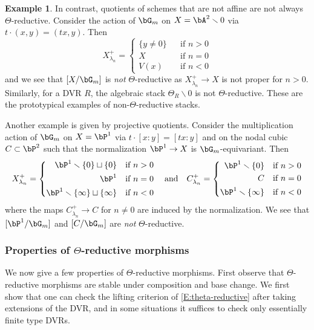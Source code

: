\documentclass[a4paper]{amsart}
\numberwithin{equation}{section}
\theoremstyle{plain}
\theoremstyle{definition}
\newtheorem{example}[thm]{Example}
\begin{document}
\begin{example} \label{E:thetaR} In contrast, quotients of schemes that are not affine are not always $\Theta$-reductive.
	Consider the action of $\bG_m$ on $X=\bA^2 \smallsetminus 0$ via $t \cdot (x,y) = (tx, y)$.  Then
 $$ X^+_{\lambda_n} = \left\{
\begin{aligned}  
	\{y \neq 0\}	&	& \text{if $n > 0$} \\
	X		& 	& \text{if $n = 0$}  \\
	V(x)			& 	& \text{if $n < 0$} 
\end{aligned}\right.
$$
and we see that $[X/\bG_m]$ is \emph{not} $\Theta$-reductive as $X^+_{\lambda_n} \to X$ is not proper for $n > 0$.    Similarly, for a DVR $R$, the algebraic stack $\Theta_R \smallsetminus 0$ is not $\Theta$-reductive.  These are the prototypical examples of non-$\Theta$-reductive stacks.

Another example is given by projective quotients. Consider the multiplication action of $\bG_m$ on $X = \bP^1$ via $t \cdot [x:y] = [tx: y]$ and on the nodal cubic $C \subset \bP^2$ such that the normalization $\bP^1 \to X$ is $\bG_m$-equivariant.
	Then 
$$ X^+_{\lambda_n} = \left\{ 
\begin{aligned}  
	\bP^1 \smallsetminus \{0\} \sqcup \{0\}			&	& \text{if $n > 0$} \\
	\bP^1								& 	& \text{if $n = 0$}  \\
	\bP^1 \smallsetminus \{\infty\} \sqcup \{\infty\}		& 	& \text{if $n < 0$} 
\end{aligned}\right.
\quad \text{and}
\quad
C^+_{\lambda_n} = \left\{ 
\begin{aligned}  
	\bP^1 \smallsetminus \{0\}			&	& \text{if $n > 0$} \\
	C									& 	& \text{if $n = 0$}  \\
	\bP^1 \smallsetminus  \{\infty\}		& 	& \text{if $n < 0$} 
\end{aligned}\right.
$$
where the maps $C^+_{\lambda_n} \to C$ for $n \neq 0$ are induced by the normalization.
We see that $ [\bP^1 / \bG_m]$ and $[C/\bG_m]$ are \emph{not} $\Theta$-reductive.

\end{example}

\subsubsection{Properties of $\Theta$-reductive morphisms}
We now give a few properties of $\Theta$-reductive morphisms.  First observe
that $\Theta$-reductive morphisms are stable under composition and base change.
We first show that one can check the lifting criterion of \eqref{E:theta-reductive} after taking extensions of the DVR, and in some situations it suffices to check only essentially finite type DVRs.
\end{document}
